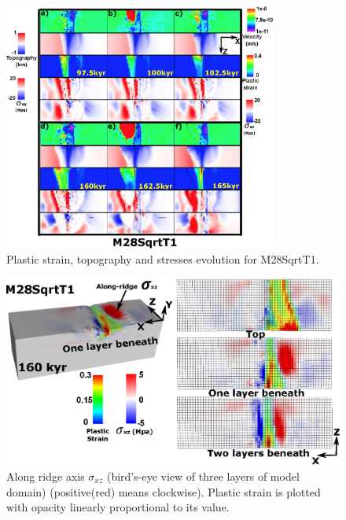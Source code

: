 \begin{figure}[h]
  \centering
    \includegraphics[width=0.8\textwidth]{./Figures/fig_Results4_4_sqrt_cut_back_with_time_1.eps}
  \caption{Plastic strain, topography and stresses evolution for M28SqrtT1.}
 \label{fig_Results4_4}
\end{figure}  
\begin{figure}[h]
  \centering
    \includegraphics[width=1.0\textwidth]{./Figures/fig_Results_3_2_5_sqrt_cut_back_Sxz_beneath.eps}
  \caption{Along ridge axis $\sigma_{xz}$ (bird's-eye view of three layers of model domain) (positive(red) means clockwise). Plastic strain is plotted with opacity linearly proportional to its value.}
 \label{fig_Results_3_2_5_sqrt_cut_back_Sxz_beneath}
\end{figure}

